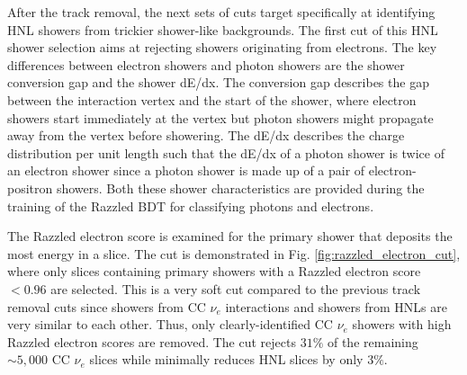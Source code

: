 After the track removal, the next sets of cuts target specifically at identifying HNL showers from trickier shower-like backgrounds.
The first cut of this HNL shower selection aims at rejecting showers originating from electrons.
The key differences between electron showers and photon showers are the shower conversion gap and the shower dE/dx.
The conversion gap describes the gap between the interaction vertex and the start of the shower, where electron showers start immediately at the vertex but photon showers might propagate away from the vertex before showering. 
The dE/dx describes the charge distribution per unit length such that the dE/dx of a photon shower is twice of an electron shower since a photon shower is made up of a pair of electron-positron showers.
Both these shower characteristics are provided during the training of the Razzled BDT for classifying photons and electrons. 

The Razzled electron score is examined for the primary shower that deposits the most energy in a slice.
The cut is demonstrated in Fig. \ref{fig:razzled_electron_cut}, where only slices containing primary showers with a Razzled electron score $< 0.96$ are selected.
This is a very soft cut compared to the previous track removal cuts since showers from CC $\nu_e$ interactions and showers from HNLs are very similar to each other.
Thus, only clearly-identified CC $\nu_e$ showers with high Razzled electron scores are removed.
The cut rejects $31\%$ of the remaining $\sim5,000$ CC $\nu_e$ slices while minimally reduces HNL slices by only $3 \%$.

